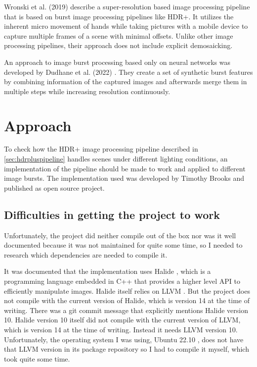 \documentclass{egpubl}
\begin{document}
Wronski et al. (2019) \cite{Wronski2019superres} describe a super-resolution based image processing pipeline that 
is based on burst image processing pipelines like HDR+. It utilizes the inherent micro movement of hands while
taking pictures with a mobile device to capture multiple frames of a scene with minimal offsets. Unlike other
image processing pipelines, their approach does not include explicit demosaicking.

An approach to image burst processing based only on neural networks was developed by Dudhane et al. (2022)
\cite{Dudhane2022restoration}. They create a set of synthetic burst features by combining information of the
captured images and afterwards merge them in multiple steps while increasing resolution continuously. 

\section{Approach}
\label{sec:approach}

To check how the HDR+ image processing pipeline described in \cref{sec:hdrpluspipeline}
handles scenes under different lighting
conditions, an implementation of the pipeline should be made to work and applied to
different image bursts. The implementation used was developed by Timothy Brooks
\cite{Brooks2016git} and published as open source project.

\subsection{Difficulties in getting the project to work}
\label{sec:difficulties}

Unfortunately, the project did neither compile out of the box 
nor was it well documented because it was not maintained for quite some time, so I 
needed to research which dependencies are needed to compile it.

It was documented that the implementation uses Halide \cite{halide2022}, which is a programming language
embedded in C++ that provides a higher level API to efficiently manipulate images. Halide
itself relies on LLVM \cite{llvm2022}. But the project does not compile with the current version
of Halide, which is version 14 at the time of writing. There was a git commit message
that explicitly mentions Halide version 10. Halide version 10 itself did not compile with
the current version of LLVM, which is version 14 at the time of writing. Instead it needs
LLVM version 10. Unfortunately, the operating system I was using, Ubuntu 22.10 \cite{ubuntu2022}, 
does not have that LLVM version in its package repository so I had to compile it myself, which took
quite some time. 
\end{document}
